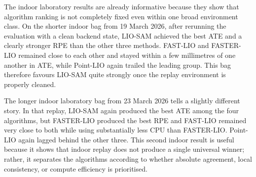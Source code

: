 \documentclass[12pt,a4paper]{report}
\begin{document}
\begin{table}[H]
\centering
\small
\caption{Indoor laboratory static rosbag results.}
\label{tab:static-indoor}
\setlength{\tabcolsep}{4pt}
\renewcommand{\arraystretch}{1.05}
\end{table}

The indoor laboratory results are already informative because they show that algorithm ranking is not completely fixed even within one broad environment class. On the shorter indoor bag from 19 March 2026, after rerunning the evaluation with a clean backend state, LIO-SAM achieved the best ATE and a clearly stronger RPE than the other three methods. FAST-LIO and FASTER-LIO remained close to each other and stayed within a few millimetres of one another in ATE, while Point-LIO again trailed the leading group. This bag therefore favours LIO-SAM quite strongly once the replay environment is properly cleaned.

The longer indoor laboratory bag from 23 March 2026 tells a slightly different story. In that replay, LIO-SAM again produced the best ATE among the four algorithms, but FASTER-LIO produced the best RPE and FAST-LIO remained very close to both while using substantially less CPU than FASTER-LIO. Point-LIO again lagged behind the other three. This second indoor result is useful because it shows that indoor replay does not produce a single universal winner; rather, it separates the algorithms according to whether absolute agreement, local consistency, or compute efficiency is prioritised.
\end{document}
